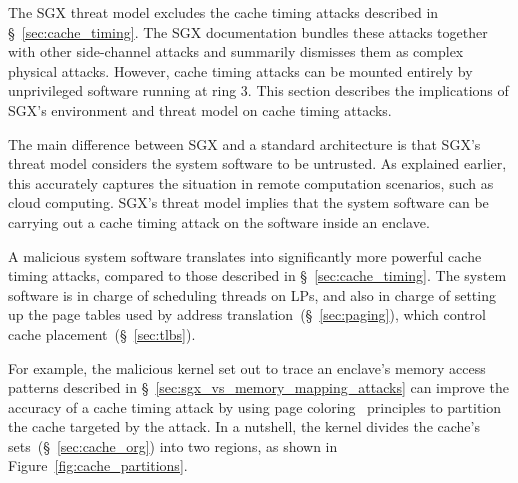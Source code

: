 \label{sec:sgx_vs_cache_timing_attacks}

The SGX threat model excludes the cache timing attacks described in
\S~\ref{sec:cache_timing}. The SGX documentation bundles these attacks together
with other side-channel attacks and summarily dismisses them as complex physical
attacks. However, cache timing attacks can be mounted entirely by unprivileged
software running at ring 3. This section describes the implications of SGX's
environment and threat model on cache timing attacks.

The main difference between SGX and a standard architecture is that SGX's
threat model considers the system software to be untrusted. As explained
earlier, this accurately captures the situation in remote computation
scenarios, such as cloud computing. SGX's threat model implies that the system
software can be carrying out a cache timing attack on the software inside an
enclave.

A malicious system software translates into significantly more powerful cache
timing attacks, compared to those described in \S~\ref{sec:cache_timing}. The
system software is in charge of scheduling threads on LPs, and also in charge
of setting up the page tables used by address
translation~(\S~\ref{sec:paging}), which control cache
placement~(\S~\ref{sec:tlbs}).

For example, the malicious kernel set out to trace an enclave's memory access
patterns described in \S~\ref{sec:sgx_vs_memory_mapping_attacks} can improve
the accuracy of a cache timing attack by using page
coloring~\cite{kessler1992coloring} principles to
partition~\cite{lin2008coloring} the cache targeted by the attack. In a
nutshell, the kernel divides the cache's sets~(\S~\ref{sec:cache_org}) into
two regions, as shown in Figure~\ref{fig:cache_partitions}.

